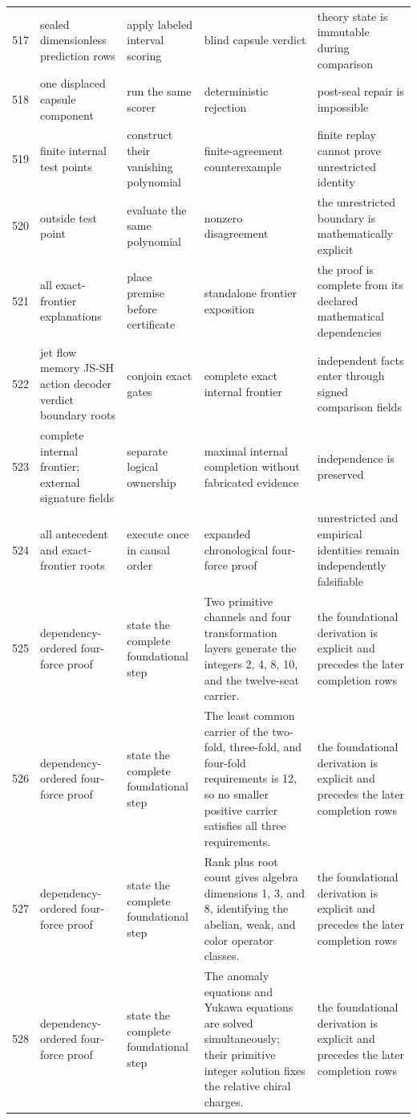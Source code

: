 \documentclass[11pt]{article}
\numberwithin{equation}{section}
\theoremstyle{remark}
\begin{document}
\begin{landscape}
\begin{longtable}{p{0.65cm}p{3.5cm}p{4.0cm}p{4.0cm}p{4.6cm}}
517&sealed dimensionless prediction rows&apply labeled interval scoring&blind capsule verdict&theory state is immutable during comparison\\
518&one displaced capsule component&run the same scorer&deterministic rejection&post-seal repair is impossible\\
519&finite internal test points&construct their vanishing polynomial&finite-agreement counterexample&finite replay cannot prove unrestricted identity\\
520&outside test point&evaluate the same polynomial&nonzero disagreement&the unrestricted boundary is mathematically explicit\\
521&all exact-frontier explanations&place premise before certificate&standalone frontier exposition&the proof is complete from its declared mathematical dependencies\\
522&jet flow memory JS-SH action decoder verdict boundary roots&conjoin exact gates&complete exact internal frontier&independent facts enter through signed comparison fields\\
523&complete internal frontier; external signature fields&separate logical ownership&maximal internal completion without fabricated evidence&independence is preserved\\
524&all antecedent and exact-frontier roots&execute once in causal order&expanded chronological four-force proof&unrestricted and empirical identities remain independently falsifiable\\
525&dependency-ordered four-force proof&state the complete foundational step&Two primitive channels and four transformation layers generate the integers 2, 4, 8, 10, and the twelve-seat carrier.&the foundational derivation is explicit and precedes the later completion rows\\
526&dependency-ordered four-force proof&state the complete foundational step&The least common carrier of the two-fold, three-fold, and four-fold requirements is 12, so no smaller positive carrier satisfies all three requirements.&the foundational derivation is explicit and precedes the later completion rows\\
527&dependency-ordered four-force proof&state the complete foundational step&Rank plus root count gives algebra dimensions 1, 3, and 8, identifying the abelian, weak, and color operator classes.&the foundational derivation is explicit and precedes the later completion rows\\
528&dependency-ordered four-force proof&state the complete foundational step&The anomaly equations and Yukawa equations are solved simultaneously; their primitive integer solution fixes the relative chiral charges.&the foundational derivation is explicit and precedes the later completion rows\\

\end{longtable}
\end{landscape}
\end{document}
